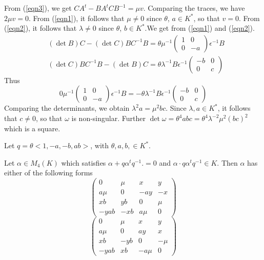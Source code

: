 \begin{Proof}
From (\ref{eqn3}), we get $CA^{t}-BA^{t}C B^{-1}=\mu v$. Comparing the traces, we have $2\mu v=0$. From (\ref{eqn1}), it follows that $\mu\neq 0$ since $\theta$, $a\in K^{\ast}$, so that $v=0$. From (\ref{eqn2}), it follows that $\lambda\neq 0$ since $\theta$, $b\in K^{\ast}$.\pageoriginale We get from (\ref{eqn1}) and (\ref{eqn2}).
$$
\begin{aligned}
&(\det B)C-(\det C)B C^{-1}B=\theta \mu^{-1}\begin{pmatrix}
1 & 0\\
0 & -a
  \end{pmatrix} \epsilon^{-1} B\\
&{}(\det C) BC^{-1}B-(\det B)C=\theta \lambda^{-1}B\epsilon^{-1}\begin{pmatrix}
-b & 0\\
0 & c
\end{pmatrix}
\end{aligned}
$$
Thus
$$
0\mu^{-1}\begin{pmatrix}
1 & 0\\
0 & -a
\end{pmatrix} \epsilon^{-1}B=-\theta \lambda^{-1}B\epsilon^{-1}\begin{pmatrix}
-b & 0\\
0 & c
\end{pmatrix}
$$
Comparing the determinants, we obtain $\lambda^{2}a=\mu^{2}bc$. Since $\lambda, a\in K^{\ast}$, it follows that $c\neq 0$, so that $\omega$ is non-singular. Further $\det \omega=\theta^{4}abc=\theta^{4}\lambda^{-2}\mu^{2}(bc)^{2}$ which is a square. 
\end{Proof}

\begin{lem}\label{lem3.4}
Let $q=\theta <1,-a,-b, ab>$, with $\theta, a, b, \in K^{\ast}$. 

Let $\alpha\in M_4(K)$ which satisfies $\alpha+q\alpha^{t}q^{-1}.=0$
and $\alpha\cdot q\alpha^{t}q^{-1}\in K$. Then $\alpha$ has either of the following forms 
\begin{equation*}
\begin{pmatrix}
0 & \mu & x & y\\
a\mu& 0 & -ay & -x\\
xb & yb & 0 & \mu\\
-yab & -xb & a\mu & 0
\end{pmatrix}\tag{$\ast$}
\end{equation*}
\begin{equation*}
\begin{pmatrix}
0 & \mu & x & y\\
a\mu & 0 & ay & x\\
xb & -yb & 0 &-\mu\\
-yab & xb & -a\mu & 0
\end{pmatrix}\tag{$\ast\ast$}
\end{equation*}
\end{lem}

